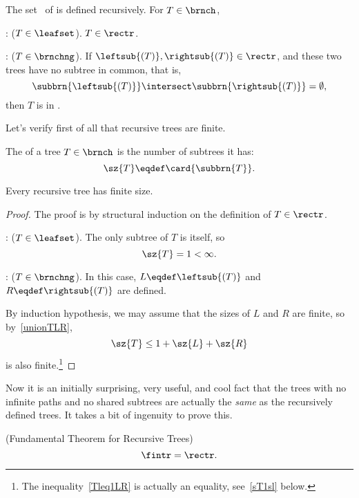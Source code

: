 \begin{definition}
\begin{definition}\label{def:rectree}
The set \rectr\ of  is defined recursively.  For
$T \in \brnch$,

: ($T \in \leafset$).  $T \in \rectr$.

: ($T \in \brnchng$).
If $\leftsub{(T)}, \rightsub{(T)} \in \rectr$, and these two trees
have no subtree in common, that is,
\[
\subbrn{\leftsub{(T)}} \intersect \subbrn{\rightsub{(T)}} = \emptyset,
\]
then $T$ is in \rectr.
\end{definition}

Let's verify first of all that recursive trees are finite.
\begin{definition}
The   of a tree $T \in \brnch$ is the
number of subtrees it has:
\begin{equation}\label{treesizedef}
\sz{T} \eqdef \card{\subbrn{T}}.
\end{equation}
\end{definition}

\begin{corollary}\label{cor:finitetree}
Every recursive tree has finite size.

\begin{proof}
The proof is by structural induction on the definition of $T \in
\rectr$.

: ($T \in \leafset$).  The only subtree of $T$
is itself, so
\[
\sz{T} = 1 < \infty.
\]

: ($T \in \brnchng$).  In this case,
$L \eqdef \leftsub{(T)}$ and $R \eqdef \rightsub{(T)}$ are defined.

By induction hypothesis, we may assume that the sizes of $L$ and $R$
are finite, so by~\eqref{unionTLR},
\begin{equation}\label{Tleq1LR}
\sz{T} \leq 1 + \sz{L} + \sz{R}
\end{equation}
is also finite.\footnote{The inequality~\eqref{Tleq1LR} is actually an
  equality, see~\eqref{sT1sl} below.}
\end{proof}
\end{corollary}

Now it is an initially surprising, very useful, and cool fact that the
trees with no infinite paths and no shared subtrees are actually the
\emph{same} as the recursively defined trees.  It takes a bit of
ingenuity to prove this.

\begin{theorem}\label{fundthmrec}(Fundamental Theorem for Recursive Trees)
\[
\fintr = \rectr.
\]
\end{theorem}


\end{definition}
